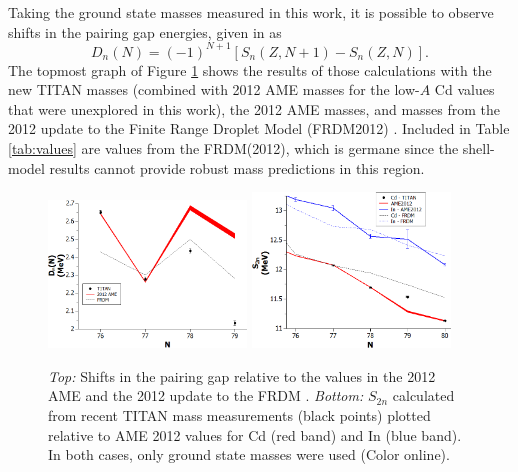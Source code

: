 \documentclass[twocolumn,prc,showpacs,preprintnumbers,amsmath,amssymb,superscriptaddress,nofootinbib,aps,10pt]{revtex4-1}
\begin{document}
Taking the ground state masses measured in this work, it is possible to observe shifts in the pairing gap energies, given in \cite{Brown2013} as
\begin{equation}
D_{n}(N) = (-1)^{N+1} \left[S_{n}(Z,N+1) - S_{n}(Z,N)\right].
\end{equation}
The topmost graph of Figure \ref{fig:structure} shows the results of those calculations with the new TITAN masses (combined with 2012 AME masses for the low-$A$ Cd values that were unexplored in this work), the 2012 AME masses, and masses from the 2012 update to the Finite Range Droplet Model (FRDM2012) \cite{Moller2016}. Included in Table \ref{tab:values} are values from the FRDM(2012), which is germane since the shell-model results cannot provide robust mass predictions in this region.

\begin{figure}[htb]
    \begin{center}
        \includegraphics[width=0.47\textwidth]{Dn.png}
        \includegraphics[width=0.47\textwidth]{S2n_In.png}
        \caption{\emph{Top:} Shifts in the pairing gap relative to the values in the 2012 AME \cite{Audi2012,Wang2012} and the 2012 update to the FRDM \cite{Moller2016}. \emph{Bottom:} $S_{2n}$ calculated from recent TITAN mass measurements (black points) plotted relative to AME 2012 values for Cd (red band) and In (blue band). In both cases, only ground state masses were used (Color online).}
        \label{fig:structure}
    \end{center}
\end{figure}
\end{document}
